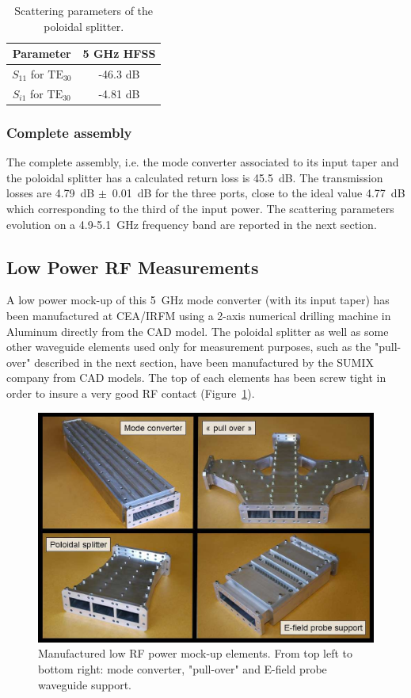 \begin{table}[h]
	\centering{}%
	\begin{tabular}{|c|c|}
		\hline 
		Parameter & 5 GHz HFSS\tabularnewline
		\hline 
		\hline 
		$S_{11}$ for $\mbox{TE}_{30}$ & -46.3 dB\tabularnewline
		\hline 
		$S_{i1}$ for $\mbox{TE}_{30}$ & -4.81 dB\tabularnewline
		\hline 
	\end{tabular}
	\caption{Scattering parameters of the poloidal splitter.}
	\label{tab:PoloidalSplitter_Sparameters}
\end{table}

\subsubsection{Complete assembly}
The complete assembly, i.e. the mode converter associated to its input taper and the poloidal splitter has  a calculated return loss is 45.5~dB. The transmission losses are 4.79~dB $\pm$~0.01~dB for the three ports, close to the ideal value 4.77~dB which corresponding to the third of the input power. The scattering parameters evolution on a 4.9-5.1~GHz frequency band are reported in the next section.

\subsection{Low Power RF Measurements}
A low power mock-up of this 5~GHz mode converter (with its input taper) has been manufactured at CEA/IRFM using a 2-axis numerical drilling machine in Aluminum directly from the CAD model. The poloidal splitter as well as some other waveguide elements used only for measurement purposes, such as the "pull-over" described in the next section, have been manufactured by the SUMIX company from CAD models. The top of each elements has been screw tight in order to insure a very good RF contact (Figure~\ref{fig:ModeConverterMockUpElements}). 

\begin{figure}[h]
	\includegraphics[width=1.0\textwidth]{figures/chap3/ITER_modeconverter/LH4ITER_ModeConverterMockUpElements}
	\caption{Manufactured low RF power mock-up elements. From top left to bottom right: mode converter,  "pull-over" and E-field probe waveguide support. }
	\label{fig:ModeConverterMockUpElements}
\end{figure}

